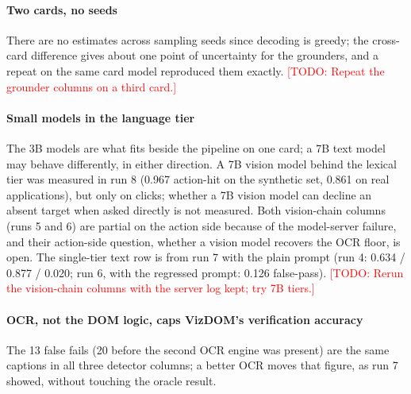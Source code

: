 \documentclass[conference]{IEEEtran}
\newcommand{\todo}[1]{\textcolor{red}{[TODO: #1]}}
\begin{document}
\paragraph{Two cards, no seeds} There are no estimates across sampling seeds since decoding is greedy; the cross-card difference gives about one point of uncertainty for the grounders, and a repeat on the same card model reproduced them exactly. \todo{Repeat the grounder columns on a third card.}

\paragraph{Small models in the language tier} The 3B models are what fits beside the pipeline on one card; a 7B text model may behave differently, in either direction. A 7B vision model behind the lexical tier was measured in run 8 (0.967 action-hit on the synthetic set, 0.861 on real applications), but only on clicks; whether a 7B vision model can decline an absent target when asked directly is not measured. Both vision-chain columns (runs 5 and 6) are partial on the action side because of the model-server failure, and their action-side question, whether a vision model recovers the OCR floor, is open. The single-tier text row is from run 7 with the plain prompt (run 4: 0.634 / 0.877 / 0.020; run 6, with the regressed prompt: 0.126 false-pass). \todo{Rerun the vision-chain columns with the server log kept; try 7B tiers.}

\paragraph{OCR, not the DOM logic, caps VizDOM's verification accuracy} The 13 false fails (20 before the second OCR engine was present) are the same captions in all three detector columns; a better OCR moves that figure, as run 7 showed, without touching the oracle result.

\end{document}
